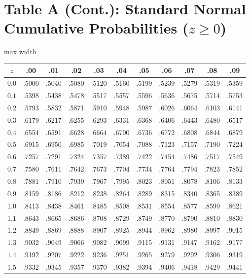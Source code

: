\clearpage
\section{Table A (Cont.): Standard Normal Cumulative Probabilities ($z \ge 0$)}
\begin{center}
\small
\begin{adjustbox}{max width=\linewidth}
\begin{tabular}{ccccccccccc}
\toprule
$z$ & .00 & .01 & .02 & .03 & .04 & .05 & .06 & .07 & .08 & .09 \\
\midrule
$0.0$ & .5000 & .5040 & .5080 & .5120 & .5160 & .5199 & .5239 & .5279 & .5319 & .5359 \\
$0.1$ & .5398 & .5438 & .5478 & .5517 & .5557 & .5596 & .5636 & .5675 & .5714 & .5753 \\
$0.2$ & .5793 & .5832 & .5871 & .5910 & .5948 & .5987 & .6026 & .6064 & .6103 & .6141 \\
$0.3$ & .6179 & .6217 & .6255 & .6293 & .6331 & .6368 & .6406 & .6443 & .6480 & .6517 \\
$0.4$ & .6554 & .6591 & .6628 & .6664 & .6700 & .6736 & .6772 & .6808 & .6844 & .6879 \\
\midrule
$0.5$ & .6915 & .6950 & .6985 & .7019 & .7054 & .7088 & .7123 & .7157 & .7190 & .7224 \\
$0.6$ & .7257 & .7291 & .7324 & .7357 & .7389 & .7422 & .7454 & .7486 & .7517 & .7549 \\
$0.7$ & .7580 & .7611 & .7642 & .7673 & .7704 & .7734 & .7764 & .7794 & .7823 & .7852 \\
$0.8$ & .7881 & .7910 & .7939 & .7967 & .7995 & .8023 & .8051 & .8078 & .8106 & .8133 \\
$0.9$ & .8159 & .8186 & .8212 & .8238 & .8264 & .8289 & .8315 & .8340 & .8365 & .8389 \\
\midrule
$1.0$ & .8413 & .8438 & .8461 & .8485 & .8508 & .8531 & .8554 & .8577 & .8599 & .8621 \\
$1.1$ & .8643 & .8665 & .8686 & .8708 & .8729 & .8749 & .8770 & .8790 & .8810 & .8830 \\
$1.2$ & .8849 & .8869 & .8888 & .8907 & .8925 & .8944 & .8962 & .8980 & .8997 & .9015 \\
$1.3$ & .9032 & .9049 & .9066 & .9082 & .9099 & .9115 & .9131 & .9147 & .9162 & .9177 \\
$1.4$ & .9192 & .9207 & .9222 & .9236 & .9251 & .9265 & .9279 & .9292 & .9306 & .9319 \\
\midrule
$1.5$ & .9332 & .9345 & .9357 & .9370 & .9382 & .9394 & .9406 & .9418 & .9429 & .9441 \\

\end{tabular}
\end{adjustbox}
\end{center}
